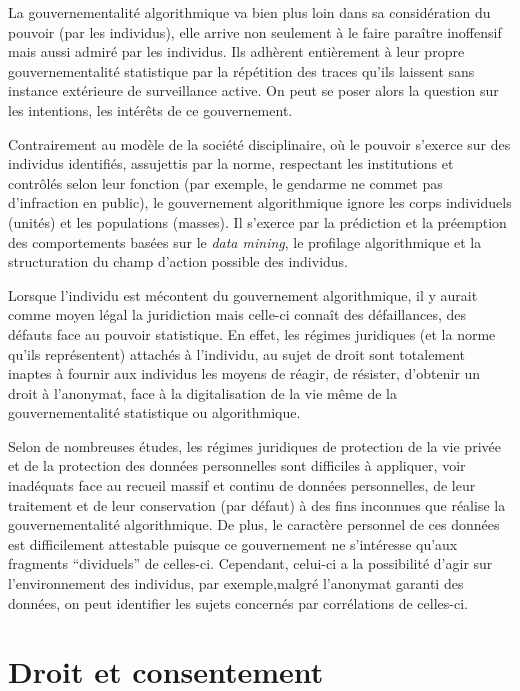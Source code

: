 \documentclass[a4paper,12pt]{report}
\begin{document}
La gouvernementalité algorithmique va bien plus loin dans sa considération du pouvoir (par les individus), elle arrive non seulement à le faire paraître inoffensif mais aussi admiré par les individus. Ils adhèrent entièrement à leur propre gouvernementalité statistique par la répétition des traces qu'ils laissent sans instance extérieure de surveillance active. On peut se poser alors la question sur les intentions, les intérêts de ce gouvernement.

Contrairement au modèle de la société disciplinaire, où le pouvoir s'exerce sur des individus identifiés, assujettis par la norme, respectant les institutions et contrôlés selon leur fonction (par exemple, le gendarme ne commet pas d'infraction en public), le gouvernement algorithmique ignore les corps individuels (unités) et les populations (masses). Il s'exerce par la prédiction et la préemption des comportements basées sur le \textit{data mining}, le profilage algorithmique et la structuration du champ d'action possible des individus.

Lorsque l'individu est mécontent du gouvernement algorithmique, il y aurait comme moyen légal la juridiction mais celle-ci connaît des défaillances, des défauts face au pouvoir statistique. En effet, les régimes juridiques (et la norme qu'ils représentent) attachés à l'individu, au sujet de droit sont totalement inaptes à fournir aux individus les moyens de réagir, de résister, d'obtenir un droit à l'anonymat, face à la digitalisation de la vie même de la gouvernementalité statistique ou algorithmique.

Selon de nombreuses études, les régimes juridiques de protection de la vie privée et de la protection des données personnelles sont difficiles à appliquer, voir inadéquats face au recueil massif et continu de données personnelles, de leur traitement et de leur conservation (par défaut) à des fins inconnues que réalise la gouvernementalité algorithmique. De plus, le caractère personnel de ces données est difficilement attestable puisque ce gouvernement ne s'intéresse qu'aux fragments ``dividuels'' de celles-ci. Cependant, celui-ci a la possibilité d'agir sur l'environnement des individus, par exemple,malgré l'anonymat garanti des données, on peut identifier les sujets concernés par corrélations de celles-ci.

\section{Droit et consentement}
\end{document}
